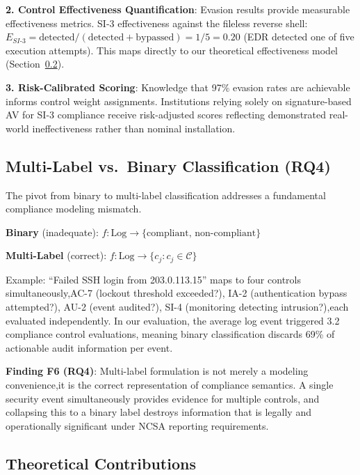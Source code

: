 \documentclass[futureinternet,article,submit,pdftex,moreauthors]{Definitions/mdpi}
\begin{document}
\textbf{2. Control Effectiveness Quantification}: Evasion results provide measurable
effectiveness metrics. SI-3 effectiveness against the fileless reverse shell:
$E_{SI\text{-}3} = \text{detected} / (\text{detected} + \text{bypassed}) = 1/5 = 0.20$
(EDR detected one of five execution attempts). This maps directly to our theoretical
effectiveness model (Section~\ref{sec:theory}).

\textbf{3. Risk-Calibrated Scoring}: Knowledge that 97\% evasion rates are
achievable~\cite{reverse_shell_paper} informs control weight assignments. Institutions relying
solely on signature-based AV for SI-3 compliance receive risk-adjusted scores reflecting
demonstrated real-world ineffectiveness rather than nominal installation.

\subsection{Multi-Label vs.\ Binary Classification (RQ4)}

The pivot from binary to multi-label classification addresses a fundamental compliance modeling
mismatch.

\textbf{Binary} (inadequate): $f\colon \text{Log} \to \{\text{compliant},\, \text{non-compliant}\}$

\textbf{Multi-Label} (correct): $f\colon \text{Log} \to \{c_j : c_j \in \mathcal{C}\}$

Example: ``Failed SSH login from 203.0.113.15'' maps to four controls
simultaneously,AC-7 (lockout threshold exceeded?), IA-2 (authentication bypass attempted?),
AU-2 (event audited?), SI-4 (monitoring detecting intrusion?),each evaluated independently.
In our evaluation, the average log event triggered 3.2 compliance control evaluations, meaning
binary classification discards 69\% of actionable audit information per event.

\textbf{Finding F6 (RQ4)}: Multi-label formulation is not merely a modeling convenience,it
is the correct representation of compliance semantics. A single security event simultaneously
provides evidence for multiple controls, and collapsing this to a binary label destroys
information that is legally and operationally significant under NCSA reporting requirements.

\subsection{Theoretical Contributions}
\label{sec:theory}
\end{document}
